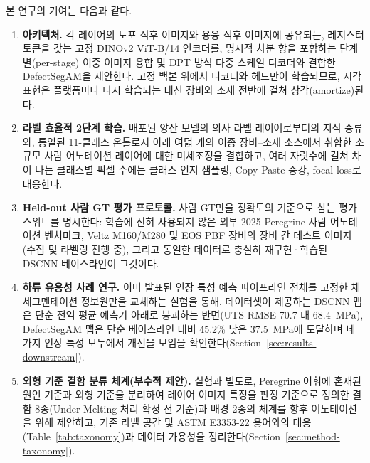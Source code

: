 본 연구의 기여는 다음과 같다.
\begin{enumerate}
  \item \textbf{아키텍처.} 각 레이어의 도포 직후 이미지와 용융 직후 이미지에
        공유되는, 레지스터 토큰을 갖는 고정 DINOv2 ViT-B/14 인코더를,
        명시적 차분 항을 포함하는 단계별(per-stage) 이중 이미지 융합 및 DPT
        방식 다중 스케일 디코더와 결합한 DefectSegAM을 제안한다. 고정 백본
        위에서 디코더와 헤드만이 학습되므로, 시각 표현은 플랫폼마다 다시
        학습되는 대신 장비와 소재 전반에 걸쳐 상각(amortize)된다.
  \item \textbf{라벨 효율적 2단계 학습.} 배포된 양산 모델의 의사 라벨
        레이어로부터의 지식 증류와, 통일된 11-클래스 온톨로지 아래 여덟 개의
        이종 장비--소재 소스에서 취합한 소규모 사람 어노테이션 레이어에 대한
        미세조정을 결합하고, 여러 자릿수에 걸쳐
        차이 나는 클래스별 픽셀 수에는 클래스 인지 샘플링, Copy-Paste 증강,
        focal loss로 대응한다.
  \item \textbf{Held-out 사람 GT 평가 프로토콜.} 사람 GT만을 정확도의
        기준으로 삼는 평가 스위트를 명시한다: 학습에 전혀 사용되지 않은
        외부 2025 Peregrine 사람 어노테이션 벤치마크, Veltz M160/M280 및
        EOS PBF 장비의 장비 간 테스트 이미지(수집 및 라벨링 진행 중),
        그리고 동일한 데이터로 충실히 재구현·학습된 DSCNN 베이스라인이
        그것이다.
  \item \textbf{하류 유용성 사례 연구.} 이미 발표된 인장 특성 예측
        파이프라인 전체를 고정한 채 세그멘테이션 정보원만을 교체하는 실험을
        통해, 데이터셋이 제공하는 DSCNN 맵은 단순 전역 평균 예측기 아래로
        붕괴하는 반면(UTS RMSE 70.7 대 68.4~MPa), DefectSegAM 맵은 단순
        베이스라인 대비 45.2\% 낮은 37.5~MPa에 도달하며 네 가지 인장 특성
        모두에서 개선을 보임을 확인한다(Section~\ref{sec:results-downstream}).
  \item \textbf{외형 기준 결함 분류 체계(부수적 제안).} 실험과 별도로,
        Peregrine 어휘에 혼재된 원인 기준과 외형 기준을 분리하여 레이어
        이미지 특징을 판정 기준으로 정의한 결함 8종(Under Melting 처리 확정 전
        기준)과 배경 2종의 체계를 향후 어노테이션을 위해 제안하고, 기존
        라벨 공간 및 ASTM E3353-22 용어와의
        대응(Table~\ref{tab:taxonomy})과 데이터 가용성을
        정리한다(Section~\ref{sec:method-taxonomy}).
\end{enumerate}

